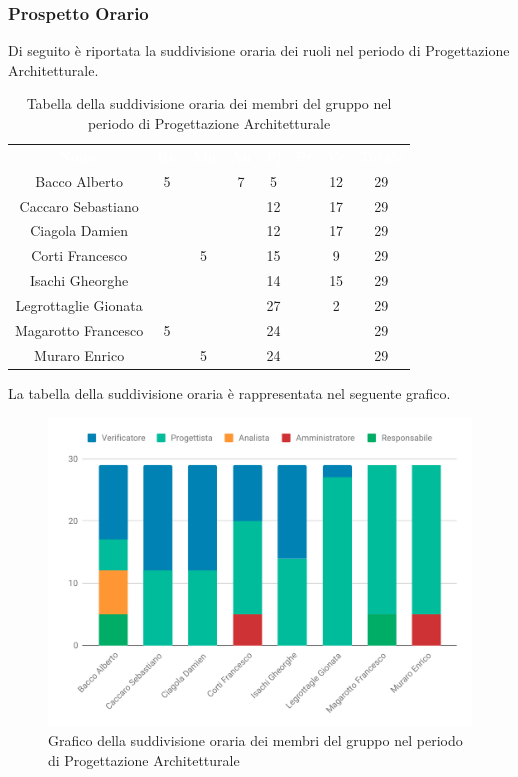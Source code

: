 \subsubsection{Prospetto Orario}
Di seguito è riportata la suddivisione oraria dei ruoli nel periodo di Progettazione Architetturale.




\begin{table}[H]	
	\begin{center}
	    \begin{tabular}{cccccccc}
			\rowcolor{greySWEight}
			\textcolor{white}{\textbf{Nome}} & \textcolor{white}{\textbf{Re}} & \textcolor{white}{\textbf{Am}} & \textcolor{white}{\textbf{An}} & \textcolor{white}{\textbf{Pj}} & \textcolor{white}{\textbf{Pr}} & \textcolor{white}{\textbf{Ve}} & \textcolor{white}{\textbf{Totale}}
			\\
			Bacco Alberto & 5 & & 7 & 5 & & 12 & 29 \\
			Caccaro Sebastiano & & & & 12 & & 17 & 29 \\
			Ciagola Damien & & & & 12 & & 17 & 29 \\
			Corti Francesco & & 5 & & 15 & & 9 & 29 \\
			Isachi Gheorghe & & & & 14 & & 15 & 29 \\
			Legrottaglie Gionata & & & & 27 & & 2 & 29 \\
			Magarotto Francesco & 5 & & & 24 & & & 29 \\
			Muraro Enrico & & 5 & & 24 & & & 29 \\
			\end{tabular}
	    \caption{Tabella della suddivisione oraria dei membri del gruppo nel periodo di Progettazione Architetturale} \label{tab:tabellaPersoneProgettazione Architetturale} 
	\end{center}
\end{table}

La tabella della suddivisione oraria è rappresentata nel seguente grafico.
\begin{figure}[H]
	\includegraphics[width=1\linewidth]{Preventivo/grafici/PA1.pdf}
	\caption{Grafico della suddivisione oraria dei membri del gruppo nel periodo di Progettazione Architetturale}
\end{figure}

